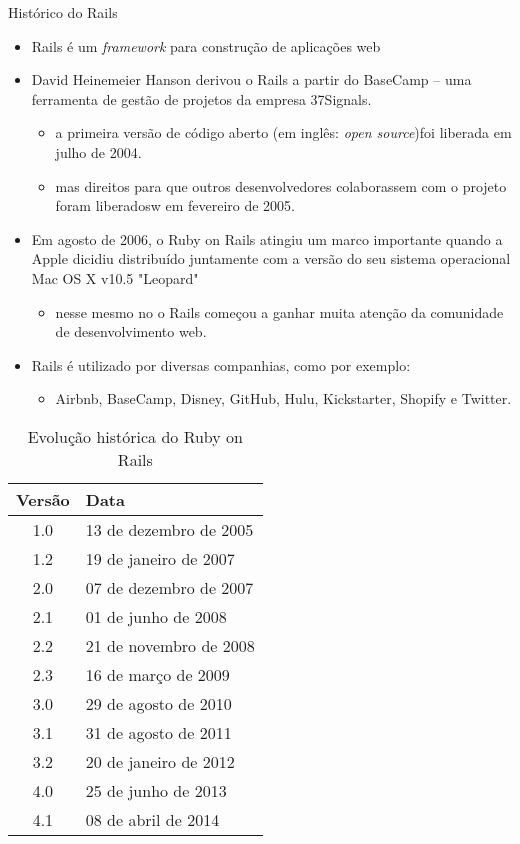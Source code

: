 \begin{frame}{Histórico do Rails}
  \begin{itemize}
  	\item Rails é um \textit{framework} para construção de aplicações web
    \item David Heinemeier Hanson \alert{derivou} o Rails a partir do BaseCamp --
      uma ferramenta de gestão de projetos da empresa 37Signals.
    \begin{itemize}
	\item a primeira versão de código aberto (em inglês: \textit{open source})foi liberada em 
	  julho de 2004.
	\item mas direitos para que outros desenvolvedores \alert{colaborassem} com o projeto foram liberadosw
	  em fevereiro de 2005.
    \end{itemize}
    \item Em agosto de 2006, o Ruby on Rails atingiu um \alert{marco importante} quando a Apple dicidiu
      distribuído juntamente com a versão do seu sistema operacional Mac OS X v10.5 "Leopard"
    \begin{itemize}
     \item nesse mesmo no o Rails começou a ganhar muita atenção da comunidade de desenvolvimento web.
    \end{itemize}
    \item Rails é utilizado por diversas companhias, como por exemplo:
    \begin{itemize}
     \item Airbnb, BaseCamp, Disney, GitHub, Hulu, Kickstarter, Shopify e Twitter.
    \end{itemize}

  \end{itemize} 
  \begin{table}\centering\scriptsize
      \begin{tabular}{@{}cl@{}}\toprule
	\textbf{Versão} & \textbf{Data}	\\ \midrule
	1.0 & 13 de dezembro de 2005	\\
	1.2 & 19 de janeiro de 2007	\\
	2.0 & 07 de dezembro de 2007	\\
	2.1 & 01 de junho de 2008	\\
	2.2 & 21 de novembro de 2008	\\ 
	2.3 & 16 de março de 2009	\\
	3.0 & 29 de agosto de 2010	\\
	3.1 & 31 de agosto de 2011	\\
	3.2 & 20 de janeiro de 2012	\\
	4.0 & 25 de junho de 2013	\\
	4.1 & 08 de abril de 2014	\\ \bottomrule
      \end{tabular}
      \caption{Evolução histórica do Ruby on Rails}
    \end{table}  
\end{frame}
